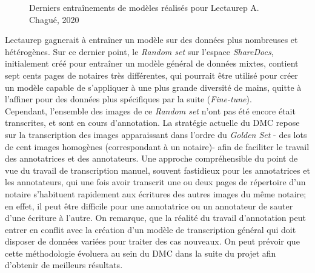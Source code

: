 \begin{figure}[H]
    \centering
    \centerline{}
    \caption{Derniers entraînements de modèles réalisés pour Lectaurep   \textcopyright A. Chagué, 2020}
    \label{fig:visual_newmodels}
\end{figure}

Lectaurep gagnerait à entraîner un modèle sur des données plus nombreuses et hétérogènes. Sur ce dernier point, le \textit{Random set} sur l'espace \textit{ShareDocs}, initialement créé pour entraîner un modèle général de données mixtes, contient sept cents pages de notaires très différentes, qui pourrait être utilisé pour créer un modèle capable de s'appliquer à une plus grande diversité de mains, quitte à l'affiner pour des données plus spécifiques par la suite (\textit{Fine-tune}).\\

Cependant, l'ensemble des images de ce \textit{Random set} n'ont pas été encore était transcrites, et sont en cours d'annotation. La stratégie actuelle du DMC repose sur la transcription des images apparaissant dans l'ordre du \textit{Golden Set} - des lots de cent images homogènes (correspondant à un notaire)- afin de faciliter le travail des annotatrices et des annotateurs. Une approche compréhensible du point de vue du travail de transcription manuel, souvent fastidieux pour les annotatrices et les annotateurs, qui une fois avoir transcrit une ou deux pages de répertoire d'un notaire s'habituent rapidement aux écritures des autres images du même notaire; en effet, il peut être difficile pour une annotatrice ou un annotateur de sauter d'une écriture à l'autre. On remarque, que la réalité du travail d'annotation peut entrer en conflit avec la création d'un modèle de transcription général qui doit disposer de données variées pour traiter des cas nouveaux. On peut prévoir que cette méthodologie évoluera au sein du DMC dans la suite du projet afin d'obtenir de meilleurs résultats.


